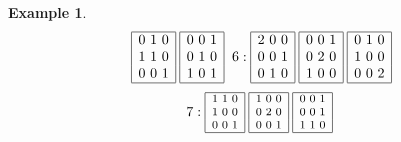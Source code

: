 \documentclass[12pt]{article}
\theoremstyle{definition}
\newtheorem{Example}[Theorem]{Example}
\begin{document}
\begin{Example}
\[{\begin{array}{|c|}
\end{array}
\hspace*{1mm}
\begin{array}{|c|}\hline
0\ 1\ 0\\ 1\ 1\ 0\\ 0\ 0\ 1\\ \hline
\end{array}
\hspace*{1mm}
\begin{array}{|c|}\hline
0\ 0\ 1\\ 0\ 1\ 0\\ 1\ 0\ 1\\ \hline
\end{array}
\hspace*{0mm}
\hspace*{2mm}6: 
\begin{array}{|c|}\hline
2\ 0\ 0\\ 0\ 0\ 1\\ 0\ 1\ 0\\ \hline
\end{array}
\hspace*{1mm}
\begin{array}{|c|}\hline
0\ 0\ 1\\ 0\ 2\ 0\\ 1\ 0\ 0\\ \hline
\end{array}
\hspace*{1mm}
\begin{array}{|c|}\hline
0\ 1\ 0\\ 1\ 0\ 0\\ 0\ 0\ 2\\ \hline
\end{array}
}\]
\[{\footnotesize
\hspace*{0mm}7: 
\begin{array}{|c|}\hline
1\ 1\ 0\\ 1\ 0\ 0\\ 0\ 0\ 1\\ \hline
\end{array}
\hspace*{1mm}
\begin{array}{|c|}\hline
1\ 0\ 0\\ 0\ 2\ 0\\ 0\ 0\ 1\\ \hline
\end{array}
\hspace*{1mm}
\begin{array}{|c|}\hline
0\ 0\ 1\\ 0\ 0\ 1\\ 1\ 1\ 0\\ \hline

\end{array}}\]
\end{Example}
\end{document}
